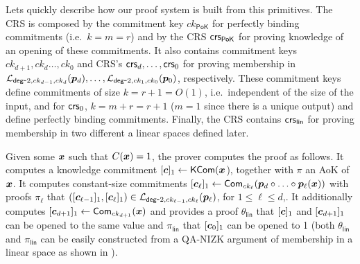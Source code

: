 Lets quickly describe how our proof system is built from this primitives. The CRS is composed by the commitment key $ck_\mathsf{PoK}$ for perfectly binding commitments (i.e.~$k=m=r$) and by the CRS $\mathsf{crs}_\mathsf{PoK}$ for proving knowledge of an opening of these commitments. It also contains commitment keys $ck_{d+1},ck_d\ldots,ck_0$ and CRS's $\mathsf{crs}_d,\ldots,\mathsf{crs}_0$ for proving membership in $\mathcal{L}_{\mathsf{deg}\mbox{-}2,ck_{d-1},ck_d}({\boldsymbol{p}}_d),\allowbreak\ldots,\allowbreak\mathcal{L}_{\mathsf{deg}\mbox{-}2,ck_1,ck_0}({\boldsymbol{p}}_0)$, respectively. These commitment keys define commitments of size $k=r+1=O(1)$, i.e.~independent of the size of the input, and for $\mathsf{crs}_0$, $k=m+r=r+1$ ($m=1$ since there is a unique output) and define perfectly binding commitments. Finally, the CRS contains $\mathsf{crs}_\mathsf{lin}$ for proving membership in two different a linear spaces defined later.

Given some ${\boldsymbol{x}}$ such that $C({\boldsymbol{x}})= 1$, the prover computes the proof as follows. It computes a knowledge commitment $[{\boldsymbol{c}}]_1\gets\mathsf{KCom}({\boldsymbol{x}}$), together with $\pi$ an AoK of ${\boldsymbol{x}}$. It computes constant-size commitments $[{\boldsymbol{c}}_\ell]_1\gets\mathsf{Com}_{ck_\ell}({\boldsymbol{p}}_d\circ\ldots\circ{\boldsymbol{p}}_\ell({\boldsymbol{x}}))$  with proofs $\pi_\ell$ that $([{\boldsymbol{c}}_{\ell-1}]_1,[{\boldsymbol{c}}_\ell]_1)\in\mathcal{L}_{\mathsf{deg}\mbox{-}2,ck_{\ell-1},ck_\ell}({\boldsymbol{p}}_\ell)$, for $1\leq \ell\leq d$,. It additionally computes $[{\boldsymbol{c}}_{d+1}]_1\gets\mathsf{Com}_{ck_{d+1}}({\boldsymbol{x}})$ and provides a proof $\theta_\mathsf{lin}$ that $[{\boldsymbol{c}}]_1$ and $[{\boldsymbol{c}}_{d+1}]_1$ can be opened to the same value and $\pi_\mathsf{lin}$ that $[{\boldsymbol{c}}_0]_1$  can be opened to 1 (both $\theta_\mathsf{lin}$ and $\pi_\mathsf{lin}$ can be easily constructed from a QA-NIZK argument of membership in a linear space as shown in \cite{AC:GonHevRaf15}).

